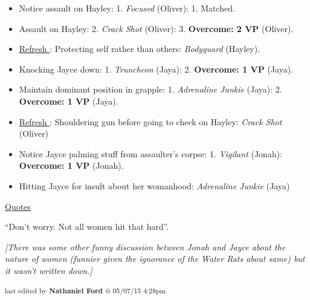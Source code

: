 \begin{itemize}
\item Notice assault on Hayley: 1.  \textit{Focused} (Oliver): 1.  Matched.
\item Assault on Hayley: 2.\textit{  Crack Shot} (Oliver): 3.  \textbf{Overcome: 2 VP} (Oliver).
\item \underline{ Refresh }: Protecting self rather than others:\textit{ Bodyguard} (Hayley).
\item Knocking Jayce down: 1.  \textit{Truncheon} (Jaya): 2.  \textbf{Overcome: 1 VP} (Jaya).
\item Maintain dominant position in grapple: 1.  \textit{Adrenaline Junkie} (Jaya): 2.  \textbf{Overcome: 1 VP} (Jaya).
\item \underline{ Refresh }: Shouldering gun before going to check on Hayley:\textit{ Crack Shot} (Oliver)
\item Notice Jayce palming stuff from assaulter's corpse: 1.  \textit{Vigilant} (Jonah):  \textbf{Overcome: 1 VP} (Jonah).
\item Hitting Jayce for insult about her womanhood:\textit{ Adrenaline Junkie} (Jaya)
\end{itemize}



\underline{  {\LARGE Quotes }  }




``Don't worry.  Not all women hit that hard''.






\textit{{[}}\textit{There was some other funny discussion between Jonah and Jayce about the nature of women (funnier given the ignorance of the Water Rats about same) but it wasn't written down.{]}}


\vspace{\fill}

\begin{flushright}
\textsubscript{last edited by \textbf{Nathaniel Ford} @ 05/07/15 4:28pm}
\end{flushright}


